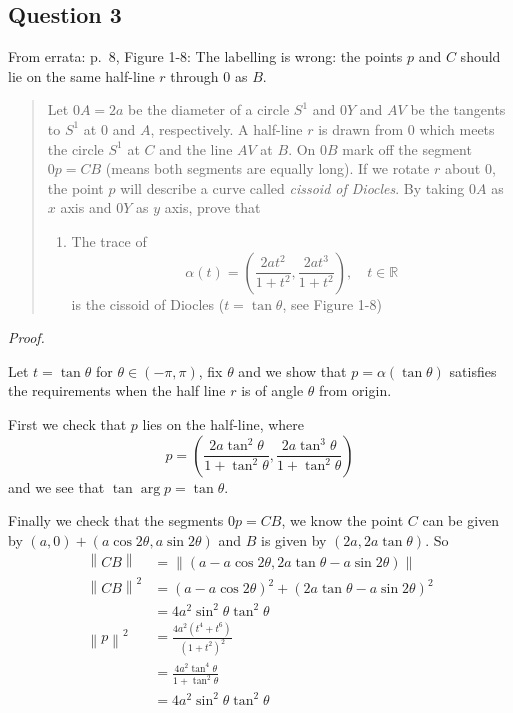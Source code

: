 \documentclass[12pt]{article}
\begin{document}
\subsection*{Question 3}

From errata: p.~8, Figure 1-8: The labelling is wrong: the points \(p\)
and \(C\) should lie on the same half-line \(r\) through \(0\) as \(B\).

\begin{quote}
Let \(0A = 2a\) be the diameter of a circle \(S^1\) and \(0Y\) and
\(AV\) be the tangents to \(S^1\) at \(0\) and \(A\), respectively. A
half-line \(r\) is drawn from \(0\) which meets the circle \(S^1\) at
\(C\) and the line \(AV\) at \(B\). On \(0B\) mark off the segment
\(0p = CB\) (means both segments are equally long). If we rotate \(r\)
about \(0\), the point \(p\) will describe a curve called \emph{cissoid
of Diocles}. By taking \(0A\) as \(x\) axis and \(0Y\) as \(y\) axis,
prove that

\begin{enumerate}
\def\labelenumi{\alph{enumi}.}
\item
  The trace of
  \[ \alpha(t) = \left( \frac{2at^2}{1+t^2}, \frac{2at^3}{1+t^2} \right) ,\quad t\in\mathbb{R} \]
  is the cissoid of Diocles (\(t = \tan\theta\), see Figure 1-8)
\end{enumerate}
\end{quote}

\emph{Proof.}

Let \(t = \tan\theta\) for \(\theta \in (-\pi,\pi)\), fix \(\theta\) and
we show that \(p = \alpha(\tan\theta)\) satisfies the requirements when
the half line \(r\) is of angle \(\theta\) from origin.

First we check that \(p\) lies on the half-line, where
\[ p = \left( \frac{2a\tan^2\theta}{1+\tan^2\theta}, \frac{2a\tan^3\theta}{1+\tan^2\theta} \right) \]
and we see that \(\tan\arg p = \tan\theta\).

Finally we check that the segments \(0p = CB\), we know the point \(C\)
can be given by \((a,0) + (a \cos 2\theta, a \sin 2\theta)\) and \(B\)
is given by \((2a, 2a\tan\theta )\). So \begin{align*}
\left\lVert CB \right\rVert &= \left\lVert \left(  a - a\cos 2\theta, 2a\tan\theta - a\sin 2\theta  \right) \right\rVert \\
\left\lVert CB \right\rVert^2 &=
(a - a\cos2\theta)^2 + (2a\tan\theta - a\sin2\theta)^2 \\
&= 4a^2\sin^2\theta\tan^2\theta \\
\left\lVert p \right\rVert^2 &= \frac{4a^2(t^4 + t^6)}{(1+t^2)^2} \\
&= \frac{4a^2 \tan^4\theta}{1+\tan^2\theta} \\
&= 4a^2\sin^2\theta\tan^2\theta
\end{align*}
\end{document}
